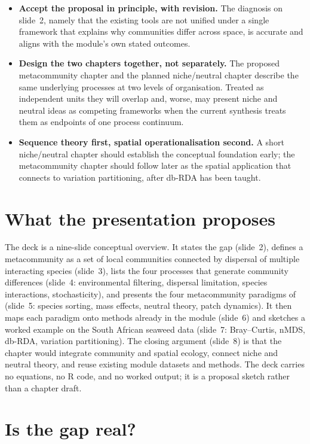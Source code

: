 \documentclass[11pt,a4paper]{article}
\begin{document}
\begin{itemize}
  \item \textbf{Accept the proposal in principle, with revision.} The diagnosis on
  slide~2, namely that the existing tools are not unified under a single framework that
  explains why communities differ across space, is accurate and aligns with the module's
  own stated outcomes.
  \item \textbf{Design the two chapters together, not separately.} The proposed
  metacommunity chapter and the planned niche/neutral chapter describe the same
  underlying processes at two levels of organisation. Treated as independent units they
  will overlap and, worse, may present niche and neutral ideas as competing frameworks
  when the current synthesis treats them as endpoints of one process continuum.
  \item \textbf{Sequence theory first, spatial operationalisation second.} A short
  niche/neutral chapter should establish the conceptual foundation early; the
  metacommunity chapter should follow later as the spatial application that connects to
  variation partitioning, after db-RDA has been taught.
\end{itemize}

\section{What the presentation proposes}

The deck is a nine-slide conceptual overview. It states the gap (slide~2), defines a
metacommunity as a set of local communities connected by dispersal of multiple
interacting species (slide~3), lists the four processes that generate community
differences (slide~4: environmental filtering, dispersal limitation, species
interactions, stochasticity), and presents the four metacommunity paradigms of
\citet{leibold2004} (slide~5: species sorting, mass effects, neutral theory, patch
dynamics). It then maps each paradigm onto methods already in the module (slide~6) and
sketches a worked example on the South African seaweed data (slide~7: Bray--Curtis,
nMDS, db-RDA, variation partitioning). The closing argument (slide~8) is that the
chapter would integrate community and spatial ecology, connect niche and neutral theory,
and reuse existing module datasets and methods. The deck carries no equations, no R code,
and no worked output; it is a proposal sketch rather than a chapter draft.

\section{Is the gap real?}
\end{document}
